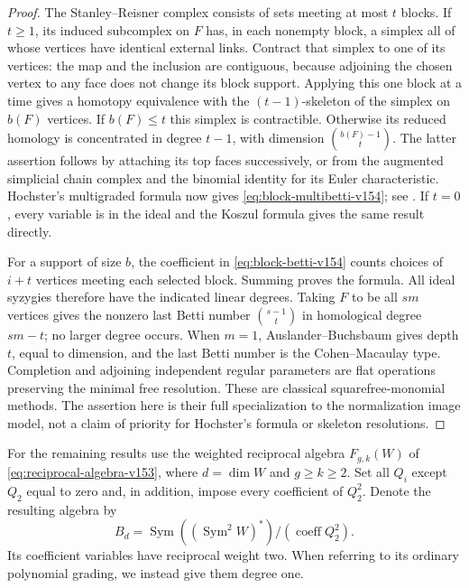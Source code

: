\documentclass[11pt,reqno]{amsart}
\numberwithin{equation}{section}
\theoremstyle{definition}\newtheorem{definition}[theorem]{Definition}
\theoremstyle{remark}\newtheorem{remark}[theorem]{Remark}
\DeclareMathOperator{\Sym}{Sym}\DeclareMathOperator{\Gr}{Gr}
\begin{document}
\begin{proof}
The Stanley--Reisner complex consists of sets meeting at most $t$
blocks. If $t\geq1$, its induced subcomplex on $F$ has, in each
nonempty block, a simplex all of whose vertices have identical
external links. Contract that simplex to one of its vertices: the
map and the inclusion are contiguous, because adjoining the chosen
vertex to any face does not change its block support. Applying this
one block at a time gives a homotopy equivalence with the
$(t-1)$-skeleton of the simplex on $b(F)$ vertices. If $b(F)\leq t$
this simplex is contractible. Otherwise its reduced homology is
concentrated in degree $t-1$, with dimension $\binom{b(F)-1}{t}$.
The latter assertion follows by attaching its top faces successively,
or from the augmented simplicial chain complex and the binomial
identity for its Euler characteristic. Hochster's multigraded
formula now gives \eqref{eq:block-multibetti-v154}; see
\cite[Chapter~5]{MillerSturmfels2005}. If $t=0$, every variable is
in the ideal and the Koszul formula gives the same result directly.

For a support of size $b$, the coefficient in
\eqref{eq:block-betti-v154} counts choices of $i+t$ vertices meeting
each selected block. Summing proves the formula. All ideal syzygies
therefore have the indicated linear degrees. Taking $F$ to be all
$sm$ vertices gives the nonzero last Betti number
$\binom{s-1}{t}$ in homological degree $sm-t$; no larger degree
occurs. When $m=1$, Auslander--Buchsbaum gives depth $t$, equal to
dimension, and the last Betti number is the Cohen--Macaulay type.
Completion and adjoining independent regular parameters are flat
operations preserving the minimal free resolution. These are
classical squarefree-monomial methods. The assertion here is their
full specialization to the normalization image model, not a claim
of priority for Hochster's formula or skeleton resolutions.
\end{proof}

For the remaining results use the weighted reciprocal algebra
$F_{g,k}(W)$ of \eqref{eq:reciprocal-algebra-v153}, where
$d=\dim W$ and $g\geq k\geq2$. Set all $Q_i$ except $Q_2$ equal
to zero and, in addition, impose every coefficient of $Q_2^2$.
Denote the resulting algebra by
\begin{equation}\label{eq:apolar-quotient-v154}
 B_d=\Sym((\Sym^2W)^*)/(\operatorname{coeff}Q_2^2).
\end{equation}
Its coefficient variables have reciprocal weight two. When referring
to its ordinary polynomial grading, we instead give them degree one.
\end{document}
